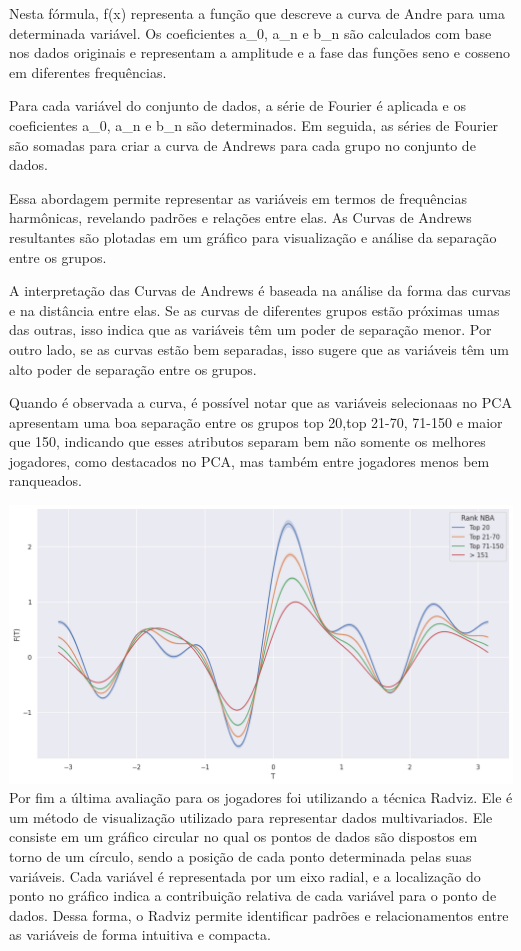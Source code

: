 \documentclass[
]{book}
\begin{document}
Nesta fórmula, f(x) representa a função que descreve a curva de Andre para uma determinada variável. Os coeficientes a\_0, a\_n e b\_n são calculados com base nos dados originais e representam a amplitude e a fase das funções seno e cosseno em diferentes frequências.

Para cada variável do conjunto de dados, a série de Fourier é aplicada e os coeficientes a\_0, a\_n e b\_n são determinados. Em seguida, as séries de Fourier são somadas para criar a curva de Andrews para cada grupo no conjunto de dados.

Essa abordagem permite representar as variáveis em termos de frequências harmônicas, revelando padrões e relações entre elas. As Curvas de Andrews resultantes são plotadas em um gráfico para visualização e análise da separação entre os grupos.

A interpretação das Curvas de Andrews é baseada na análise da forma das curvas e na distância entre elas. Se as curvas de diferentes grupos estão próximas umas das outras, isso indica que as variáveis têm um poder de separação menor. Por outro lado, se as curvas estão bem separadas, isso sugere que as variáveis têm um alto poder de separação entre os grupos.

Quando é observada a curva, é possível notar que as variáveis selecionaas no PCA apresentam uma boa separação entre os grupos top 20,top 21-70, 71-150 e maior que 150, indicando que esses atributos separam bem não somente os melhores jogadores, como destacados no PCA, mas também entre jogadores menos bem ranqueados.

\includegraphics{imagens/7.png} Por fim a última avaliação para os jogadores foi utilizando a técnica Radviz. Ele é um método de visualização utilizado para representar dados multivariados. Ele consiste em um gráfico circular no qual os pontos de dados são dispostos em torno de um círculo, sendo a posição de cada ponto determinada pelas suas variáveis. Cada variável é representada por um eixo radial, e a localização do ponto no gráfico indica a contribuição relativa de cada variável para o ponto de dados. Dessa forma, o Radviz permite identificar padrões e relacionamentos entre as variáveis de forma intuitiva e compacta.
\end{document}
